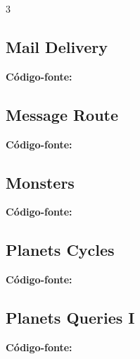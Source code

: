 \documentclass[8pt]{extarticle}
\begin{document}
\begin{multicols*}{3}
\subsection{Mail Delivery}
\begin{caixaenunciado}

\end{caixaenunciado}
\vspace{0.3cm}
\noindent\textbf{Código-fonte:}


\subsection{Message Route}
\begin{caixaenunciado}

\end{caixaenunciado}
\vspace{0.3cm}
\noindent\textbf{Código-fonte:}


\subsection{Monsters}
\begin{caixaenunciado}

\end{caixaenunciado}
\vspace{0.3cm}
\noindent\textbf{Código-fonte:}


\subsection{Planets Cycles}
\begin{caixaenunciado}

\end{caixaenunciado}
\vspace{0.3cm}
\noindent\textbf{Código-fonte:}


\subsection{Planets Queries I}
\begin{caixaenunciado}

\end{caixaenunciado}
\vspace{0.3cm}
\noindent\textbf{Código-fonte:}



\end{multicols*}
\end{document}
